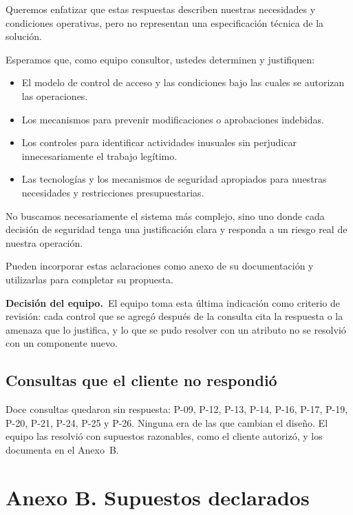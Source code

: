 \documentclass[11pt,letterpaper]{article}
\newcommand{\dec}{\textbf{Decisión del equipo.}\ }
\begin{document}
\begin{respuesta}
Queremos enfatizar que estas respuestas describen nuestras necesidades y condiciones operativas, pero
no representan una especificación técnica de la solución.

Esperamos que, como equipo consultor, ustedes determinen y justifiquen:

\begin{itemize}[itemsep=1pt,topsep=2pt]
\item El modelo de control de acceso y las condiciones bajo las cuales se autorizan las operaciones.
\item Los mecanismos para prevenir modificaciones o aprobaciones indebidas.
\item Los controles para identificar actividades inusuales sin perjudicar innecesariamente el trabajo
      legítimo.
\item Las tecnologías y los mecanismos de seguridad apropiados para nuestras necesidades y
      restricciones presupuestarias.
\end{itemize}

No buscamos necesariamente el sistema más complejo, sino uno donde cada decisión de seguridad tenga
una justificación clara y responda a un riesgo real de nuestra operación.

Pueden incorporar estas aclaraciones como anexo de su documentación y utilizarlas para completar su
propuesta.
\end{respuesta}
\dec El equipo toma esta última indicación como criterio de revisión: cada control que se agregó
después de la consulta cita la respuesta o la amenaza que lo justifica, y lo que se pudo resolver
con un atributo no se resolvió con un componente nuevo.

\subsection*{Consultas que el cliente no respondió}

Doce consultas quedaron sin respuesta: P-09, P-12, P-13, P-14, P-16, P-17, P-19, P-20, P-21, P-24,
P-25 y P-26. Ninguna era de las que cambian el diseño. El equipo las resolvió con supuestos
razonables, como el cliente autorizó, y los documenta en el Anexo~B.

\section*{Anexo B. Supuestos declarados}
\label{anexo:supuestos}
\end{document}
